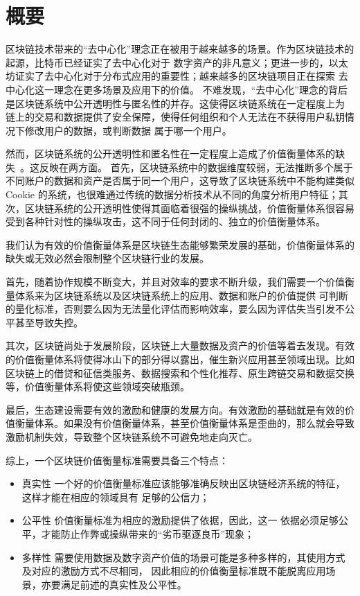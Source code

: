 
\section{概要}

区块链技术带来的“去中心化”理念正在被用于越来越多的场景。作为区块链技术的起源，比特币已经证实了去中心化对于
数字资产的非凡意义；更进一步的，以太坊证实了去中心化对于分布式应用的重要性；越来越多的区块链项目正在探索
去中心化这一理念在更多场景及应用下的价值。
不难发现，“去中心化”理念的背后是区块链系统中公开透明性与匿名性的并存。这使得区块链系统在一定程度上为
链上的交易和数据提供了安全保障，使得任何组织和个人无法在不获得用户私钥情况下修改用户的数据，或判断数据
属于哪一个用户。

然而，区块链系统的公开透明性和匿名性在一定程度上造成了价值衡量体系的缺失~\cite{meiklejohn2013fistful}。这反映在两方面。
首先，区块链系统中的数据维度较弱，无法推断多个属于不同账户的数据和资产是否属于同一个用户，这导致了区块链系统中不能构建类似Cookie
的系统，也很难通过传统的数据分析技术从不同的角度分析用户特征；其次，区块链系统的公开透明性使得其面临着很强的操纵挑战，价值衡量体系很容易
受到各种针对性的操纵攻击，这不同于任何封闭的、独立的价值衡量体系。

我们认为有效的价值衡量体系是区块链生态能够繁荣发展的基础，价值衡量体系的缺失或无效必然会限制整个区块链行业的发展。

首先，随着协作规模不断变大，并且对效率的要求不断升级，我们需要一个价值衡量体系来为区块链系统以及区块链系统上的应用、数据和账户的价值提供
可判断的量化标准，否则要么因为无法量化评估而影响效率，要么因为评估失当引发不公平甚至导致失控。

其次，区块链尚处于发展阶段，区块链上大量数据及资产的价值等着去发现。有效的价值衡量体系将使得冰山下的部分得以露出，催生新兴应用甚至领域出现。比如区块链上的借贷和征信类服务、数据搜索和个性化推荐、原生跨链交易和数据交换等，价值衡量体系将使这些领域突破瓶颈。

最后，生态建设需要有效的激励和健康的发展方向。有效激励的基础就是有效的价值衡量体系。如果没有价值衡量体系，甚至价值衡量体系是歪曲的，那么就会导致激励机制失效，导致整个区块链系统不可避免地走向灭亡。

综上，一个区块链价值衡量标准需要具备三个特点：
\begin{itemize}
\item{真实性} 一个好的价值衡量标准应该能够准确反映出区块链经济系统的特征，这样才能在相应的领域具有
足够的公信力；
\item{公平性} 价值衡量标准为相应的激励提供了依据，因此，这一
依据必须足够公平，才能防止作弊或操纵带来的“劣币驱逐良币”现象；
\item{多样性} 需要使用数据及数字资产价值的场景可能是多种多样的，其使用方式及对应的激励方式不尽相同，
因此相应的价值衡量标准既不能脱离应用场景，亦要满足前述的真实性及公平性。
\end{itemize}


